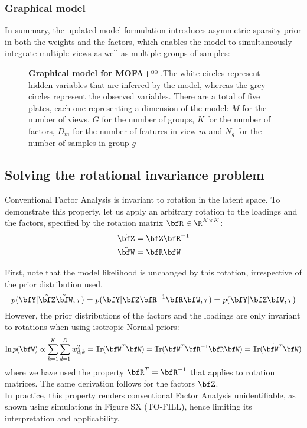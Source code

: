 \subsubsection{Graphical model}

In summary, the updated model formulation introduces asymmetric sparsity prior in both the weights and the factors, which enables the model to simultaneously integrate multiple views as well as multiple groups of samples:

\begin{figure}[H]
	\centering	
	
	\caption{\textbf{Graphical model for MOFA+}ºº
	.The white circles represent hidden variables that are inferred by the model, whereas the grey circles represent the observed variables. There are a total of five plates, each one representing a dimension of the model: $M$ for the number of views, $G$ for the number of groups, $K$ for the number of factors, $D_m$ for the number of features in view $m$ and $N_g$ for the number of samples in group $g$ 
	}
	\label{fig:MOFA2}
\end{figure}


\subsection{Solving the rotational invariance problem}

Conventional Factor Analysis is invariant to rotation in the latent space\cite{Zhao2009}. To demonstrate this property, let us apply an arbitrary rotation to the loadings and the factors, specified by the rotation matrix $\bfR \in \R^{K \times K}$:
\begin{align*}
		\tilde{\bfZ} &= \bfZ \bfR^{-1} \\
		\tilde{\bfW} &= \bfR \bfW
\end{align*}

First, note that the model likelihood is unchanged by this rotation, irrespective of the prior distribution used.
\begin{equation*}
		p(\bfY | \tilde{\bfZ} \tilde{\bfW}, \tau) = p(\bfY | \bfZ \bfR^{-1} \bfR \bfW, \tau) = p(\bfY | \bfZ \bfW, \tau)
\end{equation*}
However, the prior distributions of the factors and the loadings are only invariant to rotations when using isotropic Normal priors:
\begin{equation*}
	\ln p(\bfW) \propto \sum_{k=1}^{K} \sum_{d=1}^{D} w_{d,k}^2 = \mathrm{Tr}(\bfW^T \bfW) = \mathrm{Tr}(\bfW^T \bfR^{-1} \bfR \bfW) = \mathrm{Tr}(\tilde{\bfW^T} \tilde{\bfW})
\end{equation*}
where we have used the property $\bfR^{T} = \bfR^{-1}$ that applies to rotation matrices. The same derivation follows for the factors $\bfZ$.\\
In practice, this property renders conventional Factor Analysis unidentifiable, as shown using simulations in Figure SX (TO-FILL), hence limiting its interpretation and applicability.\\


